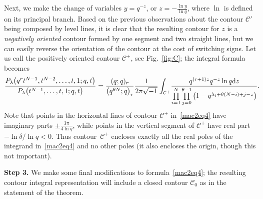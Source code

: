 \documentclass[pdftex]{sigma}
\numberwithin{equation}{section}
\newcommand{\CC}{\mathcal{C}}
\begin{document}
Next, we make the change of variables $y = q^{-z}$, or $z = -\frac{\ln{y}}{\ln{q}}$, where $\ln$ is def\/ined on its principal branch. Based on the previous observations about the contour $\CC'$ being composed by level lines, it is clear that the resulting contour for $z$ is a \textit{negatively oriented} contour formed by one segment and two straight lines, but we can easily reverse the orientation of the contour at the cost of switching signs. Let us call the positively oriented contour $\CC^+$, see Fig.~\ref{fig:C}; the integral formula becomes
\begin{gather}\label{mac2eq4}
\frac{P_{\lambda}\big(q^rt^{N-1}, t^{N-2}, \dots, t, 1; q, t\big)}{P_{\lambda}\big(t^{N-1}, \dots, t, 1; q, t\big)} = \frac{(q; q)_r}{\big(q^{\theta N}; q\big)_r}\frac{1}{2\pi\sqrt{-1}}\int_{\CC^+}\!
{\frac{q^{(r+1)z} q^{-z}\ln{q} {\rm d}z}{\prod\limits_{i=1}^N{\prod\limits_{j=0}^{\theta-1}{\big(1 - q^{\lambda_i + \theta(N - i) + j- z}\big)}}}}.\!\!\!\!
\end{gather}
Note that points in the horizontal lines of contour $\CC^+$ in~\eqref{mac2eq4} have imaginary parts $\pm\frac{3\pi}{4\ln{q}}$, while points in the vertical segment of $\CC^+$ have real part $-\ln{\delta}/\ln{q} < 0$. Thus contour~$\CC^+$ encloses exactly all the real poles of the integrand in~\eqref{mac2eq4} and no other poles (it also encloses the origin, though this not important).

\textbf{Step 3.} We make some f\/inal modif\/ications to formula~\eqref{mac2eq4}; the resulting contour integral representation will include a closed contour $\CC_0$ as in the statement of the theorem.
\end{document}

